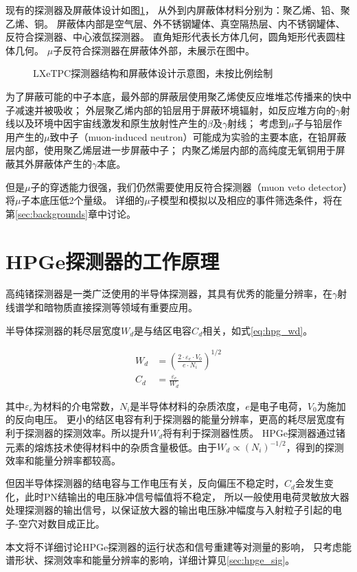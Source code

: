 现有的探测器及屏蔽体设计如图\ref{fig:relics_geo}，
从外到内屏蔽体材料分别为：聚乙烯、铅、聚乙烯、铜。
屏蔽体内部是空气层、外不锈钢罐体、真空隔热层、内不锈钢罐体、反符合探测器、中心液氙探测器。
直角矩形代表长方体几何，圆角矩形代表圆柱体几何。
$\mu$子反符合探测器在屏蔽体外部，未展示在图中。

\begin{figure}
    \centering
    
    \caption{\label{fig:relics_geo} LXeTPC探测器结构和屏蔽体设计示意图，未按比例绘制}
\end{figure}

为了屏蔽可能的中子本底，最外部的屏蔽层使用聚乙烯使反应堆堆芯传播来的快中子减速并被吸收；
外层聚乙烯内部的铅层用于屏蔽环境辐射，如反应堆方向的$\gamma$射线以及环境中因宇宙线激发和原生放射性产生的$\beta$及$\gamma$射线；
考虑到$\mu$子与铅层作用产生的$\mu$致中子（muon-induced neutron）可能成为实验的主要本底，在铅屏蔽层内部，使用聚乙烯层进一步屏蔽中子；
内聚乙烯层内部的高纯度无氧铜用于屏蔽其外屏蔽体产生的$\gamma$本底。

但是$\mu$子的穿透能力很强，我们仍然需要使用反符合探测器（muon veto detector）将$\mu$子本底压低2个量级。
详细的$\mu$子模型和模拟以及相应的事件筛选条件，将在第\ref{sec:backgrounds}章中讨论。

\section{HPGe探测器的工作原理}

高纯锗探测器是一类广泛使用的半导体探测器，其具有优秀的能量分辨率，在$\gamma$射线谱学和暗物质直接探测等领域有重要应用。

半导体探测器的耗尽层宽度$W_d$是与结区电容$C_d$相关，如式\ref{eq:hpg_wd}。

\begin{align}
    \label{eq:hpg_wd}
    W_d &= \left(\frac{2\cdot \varepsilon_e\cdot V_0}{e\cdot N_i}\right)^{1/2} \\
    C_d &= \frac{\varepsilon_e}{W_d}
\end{align}

其中$\varepsilon_e$为材料的介电常数，$N_i$是半导体材料的杂质浓度，$e$是电子电荷，$V_0$为施加的反向电压。
更小的结区电容有利于探测器的能量分辨率，更高的耗尽层宽度有利于探测器的探测效率。所以提升$W_d$将有利于探测器性质。
HPGe探测器通过锗元素的熔炼技术使得材料中的杂质含量极低。由于$W_d\propto (N_i)^{-1/2}$，得到的探测效率和能量分辨率都较高。

但因半导体探测器的结电容与工作电压有关，反向偏压不稳定时，$C_d$会发生变化，此时PN结输出的电压脉冲信号幅值将不稳定，
所以一般使用电荷灵敏放大器处理探测器的输出信号，以保证放大器的输出电压脉冲幅度与入射粒子引起的电子-空穴对数目成正比。

本文将不详细讨论HPGe探测器的运行状态和信号重建等对测量的影响，
只考虑能谱形状、探测效率和能量分辨率的影响，详细计算见\ref{sec:hpge_sig}。
